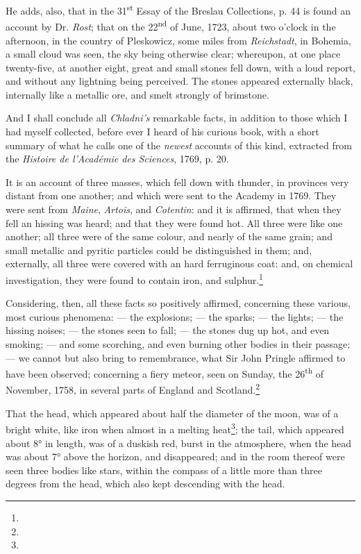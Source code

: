 \documentclass[a4paper, 12pt, oneside, twocolumn]{article}
\begin{document}
He adds, also, that in the 31\textsuperscript{st} Essay of the Breslau Collections, p. 44 is found an account by Dr. \emph{Rost}; that on the 22\textsuperscript{nd} of June, 1723, about two o'clock in the afternoon, in the country of Pleskowicz, some miles from \emph{Reichstadt}, in Bohemia, a small cloud was seen, the sky being otherwise clear; whereupon, at one place twenty-five, at another eight, great and small stones fell down, with a loud report, and without any lightning being perceived. The stones appeared externally black, internally like a metallic ore, and smelt strongly of brimstone.

And I shall conclude all \emph{Chladni's} remarkable facts, in addition to those which I had myself collected, before ever I heard of his curious book, with a short summary of what he calls one of the \emph{newest} accounts of this kind, extracted from the \emph{Histoire de l'Académie des Sciences}, 1769, p. 20.

It is an account of three masses, which fell down with thunder, in provinces very distant from one another; and which were sent to the Academy in 1769. They were sent from \emph{Maine}, \emph{Artois}, and \emph{Cotentin}: and it is affirmed, that when they fell an hissing was heard; and that they were found hot. All three were like one another; all three were of the same colour, and nearly of the same grain; and small metallic and pyritic particles could be distinguished in them; and, externally, all three were covered with an hard ferruginous coat: and, on chemical investigation, they were found to contain iron, and sulphur.\footnote{}

Considering, then, all these facts so positively affirmed, concerning these various, most curious phenomena: --- the explosions; --- the sparks; --- the lights; --- the hissing noises; --- the stones seen to fall; --- the stones dug up hot, and even smoking; --- and some scorching, and even burning other bodies in their passage; --- we cannot but also bring to remembrance, what Sir John Pringle affirmed to have been observed; concerning a fiery meteor, seen on Sunday, the 26\textsuperscript{th} of November, 1758, in several parts of England and Scotland.\footnote{}

That the head, which appeared about half the diameter of the moon, was of a bright white, like iron when almost in a melting heat\footnote{}; the tail, which appeared about 8° in length, was of a duskish red, burst in the atmosphere, when the head was about 7° above the horizon, and disappeared; and in the room thereof were seen three bodies like stars, within the compass of a little more than three degrees from the head, which also kept descending with the head.
\end{document}
